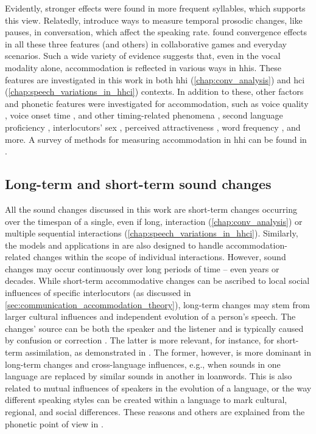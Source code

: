 Evidently, stronger effects were found in more frequent syllables, which supports this view.
Relatedly, \citet{Edlund2009pause, Xiao2015analyzing, Cohen2017converging} introduce ways to measure temporal prosodic changes, like pauses, in conversation, which affect the speaking rate.
\citet{Levitan2011measuring, Local2007phonetic} found convergence effects in all these three features (and others) in collaborative games and everyday scenarios.
Such a wide variety of evidence suggests that, even in the vocal modality alone, accommodation is reflected in various ways in \acp{hhi}.
These features are investigated in this work in both \ac{hhi} (\cref{chap:conv_analysis}) and \ac{hci} (\cref{chap:speech_variations_in_hhci}) contexts.
In addition to these, other factors and phonetic features were investigated for accommodation, such as voice quality \citep{Borrie2017conversational}, voice onset time \citep{Nielsen2011specificity}, and other timing-related phenomena \citep{Putman1984conception}, second language proficiency \citep{Law2020convergence}, interlocutors' sex \citep{Levitan2012acoustic, Bailly2014assessing}, perceived attractiveness \citep{Michalsky2017pitch}, word frequency \citep{Nenkova2008high}, and more.
A survey of methods for measuring accommodation in \ac{hhi} can be found in \citet{Lewandowski2019phonetic, DeLooze2014investigating}.

\subsection{Long-term and short-term sound changes}
\label{subsec:sound_change}

All the sound changes discussed in this work are short-term changes occurring over the timespan of a single, even if long, interaction (\cref{chap:conv_analysis}) or multiple sequential interactions (\cref{chap:speech_variations_in_hhci}).
Similarly, the models and applications in  are also designed to handle accommodation-related changes within the scope of individual interactions.
However, sound changes may occur continuously over long periods of time -- even years or decades.
While short-term accommodative changes can be ascribed to local social influences of specific interlocutors (as discussed in \cref{sec:communication_accommodation_theory}), long-term changes may stem from larger cultural influences and independent evolution of a person's speech.
The changes' source can be both the speaker and the listener \citep[][pp.~176-187]{Ohala1989sound} and is typically caused by confusion or correction \citep{Ohala1993phonetics}.
The latter is more relevant, for instance, for short-term assimilation, as demonstrated in \citet{Ohala1990phonetics}.
The former, however, is more dominant in long-term changes and cross-language influences, e.g., when sounds in one language are replaced by similar sounds in another in loanwords.
This is also related to mutual influences of speakers in the evolution of a language, or the way different speaking styles can be created within a language to mark cultural, regional, and social differences.
These reasons and others are explained from the phonetic point of view in \citet{Sweet1874history}.

